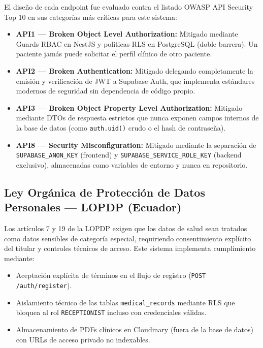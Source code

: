 \documentclass[a4paper,12pt]{article}
\begin{document}
El diseño de cada endpoint fue evaluado contra el listado OWASP API Security Top 10 en sus categorías más críticas para este sistema:

\begin{itemize}
\item \textbf{API1 — Broken Object Level Authorization:} Mitigado mediante Guards RBAC en NestJS y políticas RLS en PostgreSQL (doble barrera). Un paciente jamás puede solicitar el perfil clínico de otro paciente.
\item \textbf{API2 — Broken Authentication:} Mitigado delegando completamente la emisión y verificación de JWT a Supabase Auth, que implementa estándares modernos de seguridad sin dependencia de código propio.
\item \textbf{API3 — Broken Object Property Level Authorization:} Mitigado mediante DTOs de respuesta estrictos que nunca exponen campos internos de la base de datos (como \texttt{auth.uid()} crudo o el hash de contraseña).
\item \textbf{API8 — Security Misconfiguration:} Mitigado mediante la separación de \texttt{SUPABASE\_ANON\_KEY} (frontend) y \texttt{SUPABASE\_SERVICE\_ROLE\_KEY} (backend exclusivo), almacenadas como variables de entorno y nunca en repositorio.
\end{itemize}

\subsection{Ley Orgánica de Protección de Datos Personales — LOPDP (Ecuador)}

Los artículos 7 y 19 de la LOPDP exigen que los datos de salud sean tratados como datos sensibles de categoría especial, requiriendo consentimiento explícito del titular y controles técnicos de acceso. Este sistema implementa cumplimiento mediante:

\begin{itemize}
\item Aceptación explícita de términos en el flujo de registro (\texttt{POST /auth/register}).
\item Aislamiento técnico de las tablas \texttt{medical\_records} mediante RLS que bloquea al rol \texttt{RECEPTIONIST} incluso con credenciales válidas.
\item Almacenamiento de PDFs clínicos en Cloudinary (fuera de la base de datos) con URLs de acceso privado no indexables.
\end{itemize}

\end{document}
